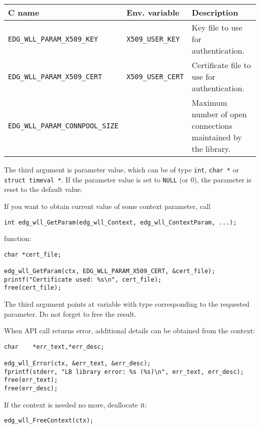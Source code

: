 \begin{table}[h]
\begin{tabularx}{\textwidth}{llX}
{\bf C name} & {\bf Env. variable} & {\bf Description} \\
\hline
\lstinline'EDG_WLL_PARAM_X509_KEY' & \lstinline'X509_USER_KEY' & Key file to use for
authentication. \\
\lstinline'EDG_WLL_PARAM_X509_CERT' & \lstinline'X509_USER_CERT' & Certificate file to use
for authentication. \\
\lstinline'EDG_WLL_PARAM_CONNPOOL_SIZE' & & Maximum number
of open connections maintained by the library. \\
\end{tabularx}
\end{table}

The third argument is parameter value, which can be of type
\verb'int', \verb'char *' or \verb'struct timeval *'. 
If the parameter value is set to \verb'NULL' (or 0), the 
parameter is reset to the default value.

If you want to obtain current value of some context parameter, call
\begin{lstlisting}
int edg_wll_GetParam(edg_wll_Context, edg_wll_ContextParam, ...);
\end{lstlisting}
function:
\begin{lstlisting}
char *cert_file;

edg_wll_GetParam(ctx, EDG_WLL_PARAM_X509_CERT, &cert_file);
printf("Certificate used: %s\n", cert_file);
free(cert_file);
\end{lstlisting}
The third argument points at variable with type corresponding to the
requested parameter. Do not forget to free the result.


%
When \LB API call returns error, additional details can be obtained
from the context:
\begin{lstlisting}
char    *err_text,*err_desc;
        
edg_wll_Error(ctx, &err_text, &err_desc);
fprintf(stderr, "LB library error: %s (%s)\n", err_text, err_desc);
free(err_text);
free(err_desc);
\end{lstlisting}

%
If the context is needed no more, deallocate it:
\begin{lstlisting}
edg_wll_FreeContext(ctx);
\end{lstlisting}

